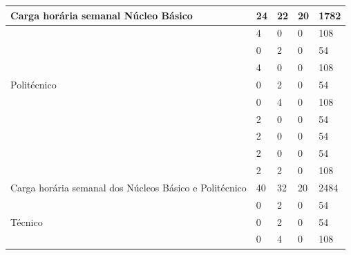 \documentclass[11pt,fleqn]{book} %
\begin{document}
\begin{table}[H]
{\begin{tabular}{|l|l|l|l|l|l|}
			\multicolumn{2}{|l|}{Carga horária semanal Núcleo Básico}                      & 24         & 22        & 20        & 1782      \\ \hline
			\multirow{7}{*}{Politécnico}   
			& \nameref{disc:quimica}                                                       & 4          & 0         & 0         & 108       \\ \cline{2-6} 
			& \nameref{disc:quimica_organica}                                              & 0          & 2         & 0         & 54        \\ \cline{2-6}			
			& \nameref{disc:biologia}                                                      & 4          & 0         & 0         & 108       \\ \cline{2-6} 	
			& \nameref{disc:bioquimica}                                                    & 0          & 2         & 0         & 54        \\ \cline{2-6} 
			& \nameref{disc:biomol}                                                        & 0          & 4         & 0         & 108       \\ \cline{2-6} 
			& \nameref{disc:bioetica}                                                      & 2          & 0         & 0         & 54        \\ \cline{2-6} 		
			& \nameref{disc:bioseg}                                                        & 2          & 0         & 0         & 54        \\ \cline{2-6} 		
			& \nameref{disc:info}                                                          & 2          & 0         & 0         & 54        \\ \cline{2-6} 
			& \nameref{disc:pratica}                                                       & 2          & 2         & 0         & 108       \\ \hline	
			\multicolumn{2}{|l|}{Carga horária semanal dos Núcleos Básico  e Politécnico}  & 40         & 32        & 20        & 2484      \\ \hline
			\multirow{7}{*}{Técnico}       
			& \nameref{disc:biotecAnimal}                                                  & 0          & 2         & 0         & 54        \\ \cline{2-6} 
			& \nameref{disc:biotecVegetal}                                                 & 0          & 2         & 0         & 54        \\ \cline{2-6} 
			& \nameref{disc:analitica}                                                     & 0          & 4         & 0         & 108       \\ \cline{2-6}

\end{tabular}}
\end{table}
\end{document}

